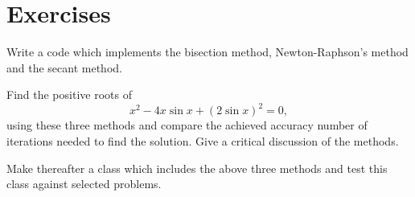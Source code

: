 



\section{Exercises}


\begin{prob}
Write a code which implements the bisection method, Newton-Raphson's method  and
the secant method.  

Find the positive roots of
\[
x^2 -4x \sin {x}+(2\sin{x})^2=0,
\]
using these three methods and compare the achieved accuracy number of iterations needed
to find the solution.  Give a critical discussion of the methods.
\end{prob}

\begin{prob}
Make thereafter a class which includes the above three methods and test this class against
selected problems.
\end{prob}


